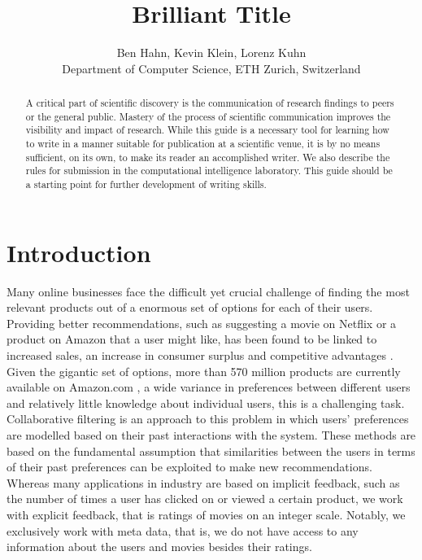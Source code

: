 \documentclass[10pt,conference,compsocconf]{IEEEtran}
\begin{document}
\title{Brilliant Title}

\author{
  Ben Hahn, Kevin Klein, Lorenz Kuhn\\
  Department of Computer Science, ETH Zurich, Switzerland
}

\maketitle

\begin{abstract}
  A critical part of scientific discovery is the
  communication of research findings to peers or the general public.
  Mastery of the process of scientific communication improves the
  visibility and impact of research. While this guide is a necessary
  tool for learning how to write in a manner suitable for publication
  at a scientific venue, it is by no means sufficient, on its own, to
  make its reader an accomplished writer. We also describe the rules
  for submission in the computational intelligence laboratory.
  This guide should be a
  starting point for further development of writing skills.
\end{abstract}

\section{Introduction}

Many online businesses face the difficult yet crucial challenge of finding the most relevant products out of a enormous set of options for each of their users. Providing better recommendations, such as suggesting a movie on Netflix or a product on Amazon that a user might like, has been found to be linked to increased sales, an increase in consumer surplus and competitive advantages \cite{hinz2010impact}.
Given the gigantic set of options, more than 570 million products are currently available on Amazon.com \cite{scrap2018}, a wide variance in preferences between different users and relatively little knowledge about individual users, this is a challenging task. Collaborative filtering \cite{sarwar2001item} is an approach to this problem in which users' preferences are modelled based on their past interactions with the system. These methods are based on the fundamental assumption that similarities between the users in terms of their past preferences can be exploited to make new recommendations. Whereas many applications in industry are based on implicit feedback, such as the number of times a user has clicked on or viewed a certain product, we work with explicit feedback, that is ratings of movies on an integer scale. Notably, we exclusively work with meta data, that is, we do not have access to any information about the users and movies besides their ratings. 
\end{document}
